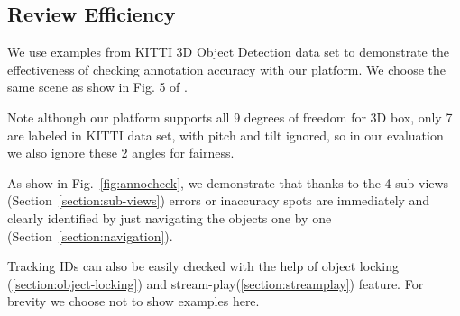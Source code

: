 \documentclass[letterpaper, 10 pt, conference]{ieeeconf}  %
\begin{document}
\subsection{Review Efficiency}
We use examples from KITTI 3D Object Detection data set \cite{Geiger2012CVPR}  to demonstrate the effectiveness of checking annotation accuracy with our platform. We choose the same scene as show in  Fig. 5 of \cite{pointatme}.

Note although our platform supports all 9 degrees of freedom for 3D box, only 7 are labeled in KITTI data set, with pitch and tilt ignored, so in our evaluation we also ignore these 2 angles for fairness.

As show in Fig.~\ref{fig:annocheck}, we demonstrate that thanks to the 4 sub-views (Section~\ref{section:sub-views}) errors or inaccuracy spots are immediately and clearly identified by just navigating the objects one by one (Section~\ref{section:navigation}).

Tracking IDs can also be easily checked with the help of object locking (\ref{section:object-locking})  and stream-play(\ref{section:streamplay}) feature. For brevity we choose not to show examples here.
\end{document}
